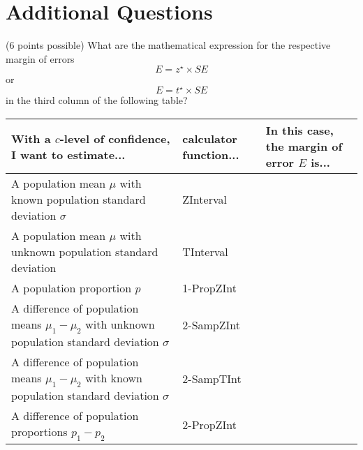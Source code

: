 \documentclass{ccg-topic}
\newcommand{\answer}[1]{}
\begin{document}
\section*{Additional Questions}



(6 points possible) What are the mathematical expression for the respective margin of errors \[E = z^\star \times SE\] or \[E = t^\star \times SE\] in the third column of the following table? 
\begin{center}

\begin{tabular}{| p{5cm} | p{2cm} | p{8cm} |}
\hline
\textbf{With a $c$-level of confidence, I want to estimate...} & \textbf{calculator function...} & \textbf{In this case, the margin of error $E$ is...} \\
\hline
\hline
A population mean $\mu$ with known population standard deviation $\sigma$ & {\answer \texttt{ZInterval}} &  \\[1.5cm]
\hline
A population mean $\mu$ with unknown population standard deviation &{\answer \texttt{TInterval}} & \\[1.5cm]
\hline
A population proportion $p$ & {\answer \texttt{1-PropZInt}}& \\[1.5cm]
\hline
A difference of population means $\mu_1 - \mu_2$ with unknown population standard deviation $\sigma$  &{\answer \texttt{2-SampZInt}} &\\[1.5cm]
\hline
A difference of population means $\mu_1 - \mu_2$ with known population standard deviation $\sigma$  & {\answer \texttt{2-SampTInt}}&\\[1.5cm]
\hline
A difference of population proportions $p_1 - p_2$ &{\answer \texttt{2-PropZInt}} &\\[1.5cm]
\hline
\end{tabular}

\end{center}
\end{document}
